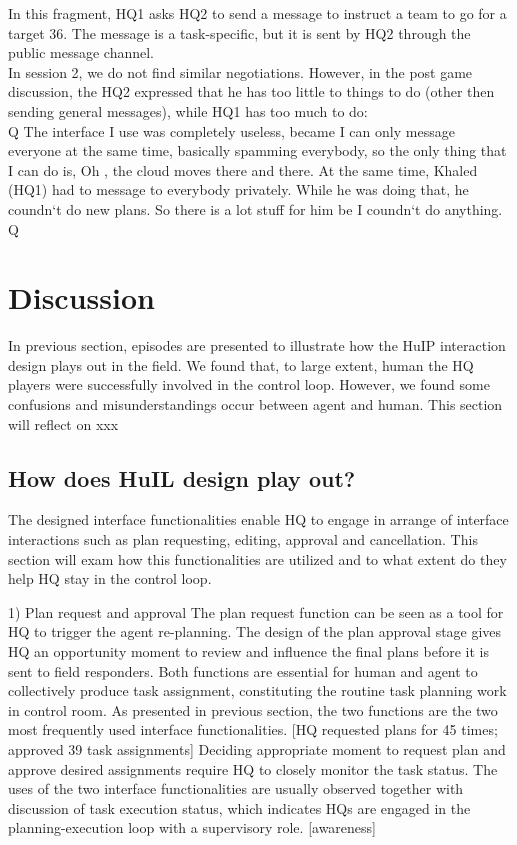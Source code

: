In this fragment, HQ1 asks HQ2 to send a message to instruct a team to go for a target 36. The message is a task-specific, but it is sent by HQ2 through the public message channel. \\

In session 2, we do not find similar negotiations. However, in the post game discussion, the HQ2 expressed that he has too little to things to do (other then sending general messages), while HQ1 has too much to do:   \\

Q The interface I use was completely useless, became I can only message everyone at the same time, basically spamming everybody, so the only thing that I can do is, Oh , the cloud moves there and there. At the same time, Khaled (HQ1) had to message to everybody privately. While he was doing that, he coundn`t do new plans. So there is a lot stuff for him be I coundn`t do anything. Q

\section{Discussion}

In previous section, episodes are presented to illustrate how the HuIP interaction design plays out in the field.  We found that, to large extent, human the HQ players were successfully involved in the control loop. However, we found some confusions and misunderstandings occur between agent and human. This section will reflect on xxx \\

\subsection{How does HuIL design play out?}
The designed interface functionalities enable HQ to engage in arrange of interface interactions such as plan requesting, editing, approval and cancellation. This section will exam how this functionalities are utilized and to what extent do they help HQ stay in the control loop. 

1) Plan request and approval 
The plan request function can be seen as a tool for HQ to trigger the agent re-planning. The design of the plan approval stage gives HQ an opportunity moment to review and influence the final plans before it is sent to field responders. Both functions are essential for human and agent to collectively produce task assignment, constituting the routine task planning work in control room. As presented in previous section, the two functions are the two most frequently used interface functionalities. [HQ requested plans for 45 times; approved 39 task assignments] Deciding appropriate moment to request plan and approve desired assignments require HQ to closely monitor the task status. The uses of the two interface functionalities are usually observed together with discussion of task execution status, which indicates HQs are engaged in the planning-execution loop with a supervisory role. [awareness]

